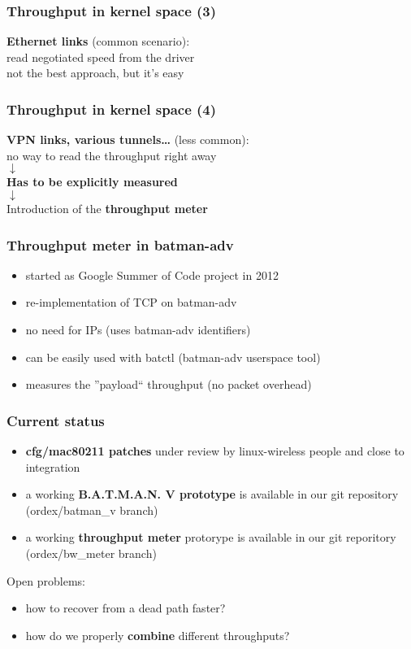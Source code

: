 \documentclass[slidestop]{beamer}
\begin{document}
\begin{frame}[c]
	\frametitle{Throughput in kernel space (3)}
	\begin{center}
	\textbf{Ethernet links} (common scenario):\\
	read negotiated speed from the driver\\[0.5cm]
	\pause
	not the best approach, but it's easy\\[0.5cm]
	\end{center}
\end{frame}

\begin{frame}
	\frametitle{Throughput in kernel space (4)}
	\begin{center}
	\textbf{VPN links, various tunnels\dots} (less common):\\
	no way to read the throughput right away\\[0.1cm]
	$\downarrow$\\[0.5cm]
	\textbf{Has to be explicitly measured}\\[0.5cm]
	\pause
	$\downarrow$\\[0.5cm]
	Introduction of the \textbf{throughput meter}
	\end{center}
\end{frame}

\begin{frame}[c]
	\frametitle{Throughput meter in batman-adv}
	\begin{itemize}
		\item started as Google Summer of Code project in 2012
		\item re-implementation of TCP on batman-adv
		\item no need for IPs (uses batman-adv identifiers)
		\item can be easily used with batctl (batman-adv userspace tool)
		\item measures the ''payload`` throughput (no packet overhead)
	\end{itemize}
\end{frame}

\begin{frame}[c]
	\frametitle{Current status}
	\begin{itemize}
		\item \textbf{cfg/mac80211 patches} under review by linux-wireless people
			and close to integration
		\item a working \textbf{B.A.T.M.A.N. V prototype} is available in our git
			repository (ordex/batman\_v branch)
		\item a working \textbf{throughput meter} protorype is available
			in our git reporitory (ordex/bw\_meter branch)
	\end{itemize}
	\pause
	Open problems:
	\begin{itemize}
		\item how to recover from a dead path faster?
		\pause
		\item how do we properly \textbf{combine} different throughputs?
	\end{itemize}
\end{frame}
\end{document}
